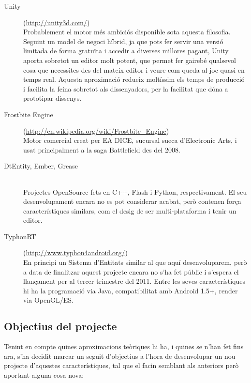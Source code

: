 \begin{description}
  \item[Unity] (\url{http://unity3d.com/}) \hfill \\
    Probablement el motor més ambiciós disponible sota aquesta filosofia. Seguint un model de negoci híbrid, ja que pots fer servir una versió limitada de forma gratuïta i accedir a diverses millores pagant, Unity aporta sobretot un editor molt potent, que permet fer gairebé qualsevol cosa que necessites des del mateix editor i veure com queda al joc quasi en temps real. Aquesta aproximació redueix moltíssim els temps de producció i facilita la feina sobretot als dissenyadors, per la facilitat que dóna a prototipar dissenys.
    
  \item[Frostbite Engine] (\url{http://en.wikipedia.org/wiki/Frostbite_Engine}) \hfill \\
    Motor comercial creat per EA DICE, sucursal sueca d'Electronic Arts, i usat principalment a la saga Battlefield des del 2008.
    
  \item[DtEntity, Ember, Grease] \citep{EntityWiki} \hfill \\
    Projectes OpenSource fets en C++, Flash i Python, respectivament. El seu desenvolupament encara no es pot considerar acabat, però contenen força característiques similars, com el desig de ser multi-plataforma i tenir un editor.
    
  \item[TyphonRT] (\url{http://www.typhon4android.org/}) \hfill \\
    En principi un Sistema d'Entitats similar al que aquí desenvoluparem, però a data de finalitzar aquest projecte encara no s'ha fet públic i s'espera el llançament per al tercer trimestre del 2011. Entre les seves característiques hi ha la programació via Java, compatibilitat amb Android 1.5+, render via OpenGL/ES.
  
\end{description}

\subsection{Objectius del projecte}

Tenint en compte quines aproximacions teòriques hi ha, i quines se n'han fet fins ara, s'ha decidit marcar un seguit d'objectius a l'hora de desenvolupar un nou projecte d'aquestes característiques, tal que el facin semblant als anteriors però aportant alguna cosa nova:

